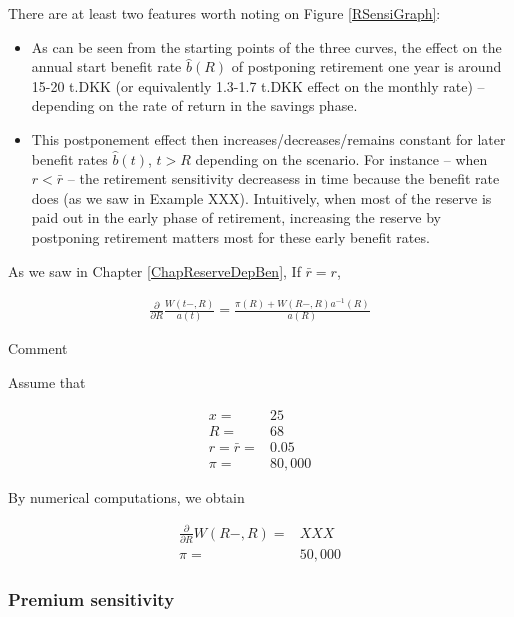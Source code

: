 \documentclass{article}
\newcommand{\1}[1]{\mathbbm{1}_{\left\lbrace #1 \right\rbrace}}
\theoremstyle{break}
\theoremstyle{remark}
\newenvironment{remark}
  {\pushQED{\qed}\renewcommand{\qedsymbol}{\scalebox{1.4}{$\circ$}}\remarkx}
  {\popQED\endremarkx}
\numberwithin{equation}{section}
\begin{document}
\begin{example}
There are at least two features worth noting on Figure \ref{RSensiGraph}:

\begin{itemize}
	\item As can be seen from the starting points of the three curves, the effect on the annual start benefit rate $\hat{b}(R)$ of postponing retirement one year is around 15-20 t.DKK (or equivalently 1.3-1.7 t.DKK effect on the monthly rate) -- depending on the rate of return in the savings phase.
	\item This postponement effect then increases/decreases/remains constant for later benefit rates $\hat{b}(t)$, $t>R$ depending on the scenario. For instance -- when $r < \bar{r}$ -- the retirement sensitivity decreasess in time because the benefit rate does (as we saw in Example XXX). Intuitively, when most of the reserve is paid out in the early phase of retirement, increasing the reserve by postponing retirement matters most for these early benefit rates.
\end{itemize}

\end{example}

\begin{remark}
As we saw in Chapter \ref{ChapReserveDepBen}, If $\bar{r}=r$, 

\begin{align*}
	\frac{\partial}{\partial R} \frac{W(t-,R)}{a(t)} = \frac{\pi (R) + W(R-,R) a^{-1}(R)}{a(R)}
\end{align*}
\end{remark}

Comment

\begin{example}
	Assume that
	
	\begin{align*}
		x =& 25 \\
		R =& 68 \\
		r = \bar{r} =& 0.05 \\
		\pi =& 80,000
	\end{align*}

	By numerical computations, we obtain
	
	\begin{align*}
		\frac{\partial}{\partial R} W(R-,R) =& XXX \\
		\pi =& 50,000
	\end{align*}
\end{example}

\subsubsection{Premium sensitivity}
\end{document}
